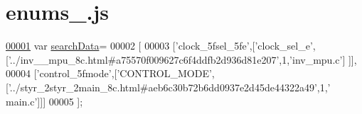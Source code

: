\hypertarget{enums__1_8js_source}{}\section{enums\+\_.\+js}
\label{enums__1_8js_source}

\begin{DoxyCode}
\hypertarget{enums__1_8js_source.tex_l00001}{}\hyperlink{enums__1_8js_ad01a7523f103d6242ef9b0451861231e}{00001} var \hyperlink{enums__1_8js_ad01a7523f103d6242ef9b0451861231e}{searchData}=
00002 [
00003   [\textcolor{stringliteral}{'clock\_5fsel\_5fe'},[\textcolor{stringliteral}{'clock\_sel\_e'},[\textcolor{stringliteral}{'../inv\_\_mpu\_8c.html#a75570f009627c6f4ddfb2d936d81e207'},1,\textcolor{stringliteral}{'inv\_mpu.c'}]
      ]],
00004   [\textcolor{stringliteral}{'control\_5fmode'},[\textcolor{stringliteral}{'CONTROL\_MODE'},[\textcolor{stringliteral}{'../styr\_2styr\_2main\_8c.html#aeb6c30b72b6dd0937e2d45de44322a49'},1,\textcolor{stringliteral}{'
      main.c'}]]]
00005 ];
\end{DoxyCode}
